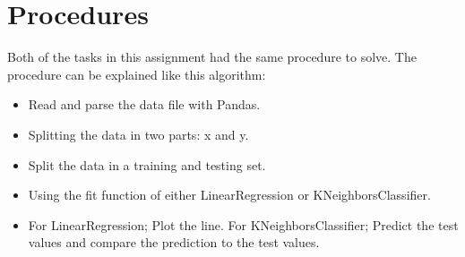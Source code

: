 \documentclass[titlepage, 11pt]{article}
\begin{document}
	\section{Procedures}
	
	Both of the tasks in this assignment had the same procedure to solve. The procedure can be explained like this algorithm: 
	\begin{itemize}
		\item Read and parse the data file with Pandas.
		\item Splitting the data in two parts: x and y.
		\item Split the data in a training and testing set.
		\item Using the fit function of either LinearRegression or KNeighborsClassifier.
		\item For LinearRegression; Plot the line. For KNeighborsClassifier; Predict the test values and compare the prediction to the test values. 
	\end{itemize}
\end{document}
